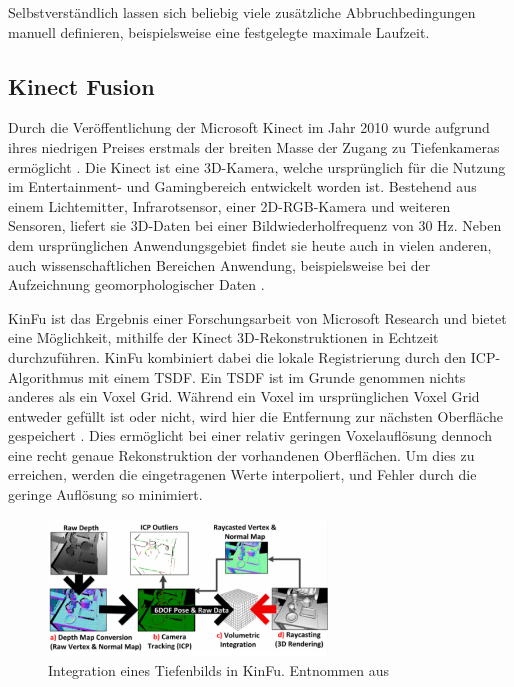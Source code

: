 Selbstverständlich lassen sich beliebig viele zusätzliche Abbruchbedingungen manuell definieren, beispielsweise eine festgelegte maximale Laufzeit.

\subsection{Kinect Fusion}
\label{subsec:kinfu}

Durch die Veröffentlichung der Microsoft Kinect im Jahr 2010 wurde aufgrund ihres niedrigen Preises erstmals der breiten Masse der Zugang zu Tiefenkameras ermöglicht \cite[1:55]{kinfuTalkYoutube}.
Die Kinect ist eine 3D-Kamera, welche ursprünglich für die Nutzung im Entertainment- und Gamingbereich entwickelt worden ist.
Bestehend aus einem Lichtemitter, Infrarotsensor, einer 2D-RGB-Kamera und weiteren Sensoren, liefert sie 3D-Daten bei einer Bildwiederholfrequenz von 30 Hz.
Neben dem ursprünglichen Anwendungsgebiet findet sie heute auch in vielen anderen, auch wissenschaftlichen Bereichen Anwendung, beispielsweise bei der Aufzeichnung geomorphologischer Daten \cite{mankoff2013kinect}.

\ac{KinFu} ist das Ergebnis einer Forschungsarbeit von Microsoft Research \cite{izadi2011kinectfusion} und bietet eine Möglichkeit, mithilfe der Kinect 3D-Rekonstruktionen in Echtzeit durchzuführen.
\ac{KinFu} kombiniert dabei die lokale Registrierung durch den \ac{ICP}-Algorithmus mit einem \ac{TSDF}.
Ein \ac{TSDF} ist im Grunde genommen nichts anderes als ein Voxel Grid.
Während  ein Voxel im ursprünglichen Voxel Grid entweder gefüllt ist oder nicht, wird hier die Entfernung zur nächsten Oberfläche gespeichert \cite{curless1996volumetric}.
Dies ermöglicht bei einer relativ geringen Voxelauflösung dennoch eine recht genaue Rekonstruktion der vorhandenen Oberflächen.
Um dies zu erreichen, werden die eingetragenen Werte interpoliert, und Fehler durch die geringe Auflösung so minimiert.

\begin{figure}[ht]
	\centering
	\includegraphics[width=0.66\textwidth, frame]{images/kinfu-integration.png}
	\caption{Integration eines Tiefenbilds in \ac{KinFu}. Entnommen aus \cite{izadi2011kinectfusion}}
	\label{fig:kinfu-integration}
\end{figure}

